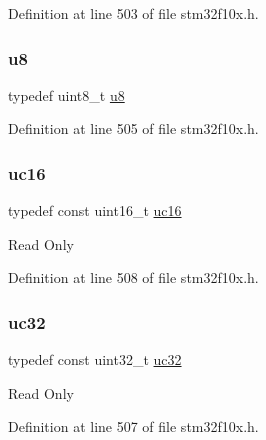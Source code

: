 Definition at line 503 of file stm32f10x.\+h.

\mbox{\label{group___exported__types_ga92c50087ca0e64fa93fc59402c55f8ca}} 
\subsubsection{\texorpdfstring{u8}{u8}}
{\footnotesize\ttfamily typedef uint8\+\_\+t \hyperlink{group___exported__types_ga92c50087ca0e64fa93fc59402c55f8ca}{u8}}



Definition at line 505 of file stm32f10x.\+h.

\mbox{\label{group___exported__types_gabc715ea3779494b5a4f53173a397f7cb}} 
\subsubsection{\texorpdfstring{uc16}{uc16}}
{\footnotesize\ttfamily typedef const uint16\+\_\+t \hyperlink{group___exported__types_gabc715ea3779494b5a4f53173a397f7cb}{uc16}}

Read Only 

Definition at line 508 of file stm32f10x.\+h.

\mbox{\label{group___exported__types_ga5b628e6a05856ff67e535fa391a57683}} 
\subsubsection{\texorpdfstring{uc32}{uc32}}
{\footnotesize\ttfamily typedef const uint32\+\_\+t \hyperlink{group___exported__types_ga5b628e6a05856ff67e535fa391a57683}{uc32}}

Read Only 

Definition at line 507 of file stm32f10x.\+h.

\mbox{\label{group___exported__types_gac74022c74a461f810e0d4fdc9bfea480}} 

